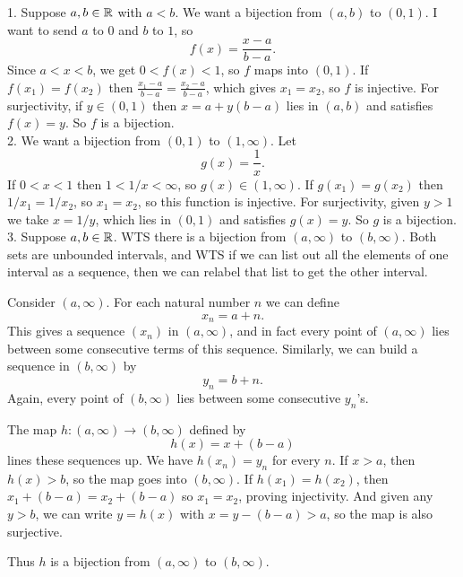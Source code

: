 \documentclass{report}
\begin{document}
\begin{proofWithHibiscus}
  1. Suppose $a,b \in \mathbb{R}$ with $a<b$. We want a bijection from $(a,b)$ to $(0,1)$. 
  I want to send $a$ to $0$ and $b$ to $1$, so 
  \[
    f(x) = \frac{x-a}{b-a}.
  \]
  Since $a<x<b$, we get $0<f(x)<1$, so $f$ maps into $(0,1)$. 
  If $f(x_1)=f(x_2)$ then $\frac{x_1-a}{b-a}=\frac{x_2-a}{b-a}$, which gives $x_1=x_2$, so $f$ is injective. 
  For surjectivity, if $y\in(0,1)$ then $x=a+y(b-a)$ lies in $(a,b)$ and satisfies $f(x)=y$. 
  So $f$ is a bijection. \\

  2. We want a bijection from $(0,1)$ to $(1,\infty)$. 
  Let 
  \[
    g(x) = \frac{1}{x}.
  \]
  If $0<x<1$ then $1<1/x<\infty$, so $g(x)\in(1,\infty)$. 
  If $g(x_1)=g(x_2)$ then $1/x_1=1/x_2$, so $x_1=x_2$, so this function is injective. 
  For surjectivity, given $y>1$ we take $x=1/y$, which lies in $(0,1)$ and satisfies $g(x)=y$. 
  So $g$ is a bijection. \\

  3. Suppose $a,b \in \mathbb{R}$. WTS there is a bijection from $(a,\infty)$ to $(b,\infty)$. 
  Both sets are unbounded intervals, and WTS if we can list out all the elements of one interval as a sequence, then we can relabel that list to get the other interval. 

  Consider $(a,\infty)$. For each natural number $n$ we can define
  \[
    x_n = a+n.
  \]
  This gives a sequence $(x_n)$ in $(a,\infty)$, and in fact every point of $(a,\infty)$ lies between some consecutive terms of this sequence. Similarly, we can build a sequence in $(b,\infty)$ by
  \[
    y_n = b+n.
  \]
  Again, every point of $(b,\infty)$ lies between some consecutive $y_n$’s. 

  The map $h:(a,\infty)\to(b,\infty)$ defined by
  \[
    h(x) = x+(b-a)
  \]
  lines these sequences up. We have $h(x_n)=y_n$ for every $n$. If $x>a$, then $h(x)>b$, so the map goes into $(b,\infty)$. If $h(x_1)=h(x_2)$, then $x_1+(b-a)=x_2+(b-a)$ so $x_1=x_2$, proving injectivity. And given any $y>b$, we can write $y=h(x)$ with $x=y-(b-a)>a$, so the map is also surjective. 

  Thus $h$ is a bijection from $(a,\infty)$ to $(b,\infty)$.
\end{proofWithHibiscus}
\end{document}
